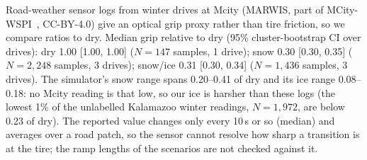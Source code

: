Road-weather sensor logs from winter drives at Mcity (MARWIS, part of MCity-WSPI~\citep{wspi}, CC-BY-4.0) give an optical grip proxy rather than tire friction, so we compare ratios to dry. Median grip relative to dry (95\% cluster-bootstrap CI over drives): dry 1.00 [1.00, 1.00] ($N=147$ samples, 1 drive); snow 0.30 [0.30, 0.35] ($N=2,248$ samples, 3 drives); snow/ice 0.31 [0.30, 0.34] ($N=1,436$ samples, 3 drives). The simulator's snow range spans 0.20--0.41 of dry and its ice range 0.08--0.18: no Mcity reading is that low, so our ice is harsher than these logs (the lowest 1\% of the unlabelled Kalamazoo winter readings, $N=1,972$, are below 0.23 of dry). The reported value changes only every 10\,s or so (median) and averages over a road patch, so the sensor cannot resolve how sharp a transition is at the tire; the ramp lengths of the scenarios are not checked against it.
